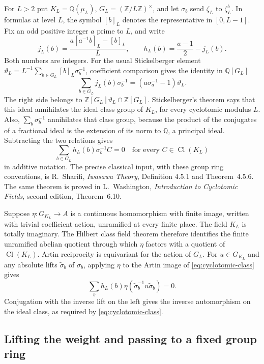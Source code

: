For \(L>2\) put \(K_L=\mathbb Q(\mu_L)\),
\(G_L=(\mathbb Z/L\mathbb Z)^\times\), and let \(\sigma_b\) send
\(\zeta_L\) to \(\zeta_L^b\). In formulas at level \(L\), the
symbol \([b]_L\) denotes the representative in \([0,L-1]\).
Fix an odd positive integer \(a\) prime to \(L\), and write
\[
 j_L(b)=\frac{a[a^{-1}b]_L-[b]_L}{L},\qquad
 h_L(b)=\frac{a-1}{2}-j_L(b).
\]
Both numbers are integers. For the usual Stickelberger element
\(\vartheta_L=L^{-1}\sum_{b\in G_L}[b]_L\sigma_b^{-1}\), coefficient
comparison gives the identity in \(\mathbb Q[G_L]\)
\[
 \sum_{b\in G_L}j_L(b)\sigma_b^{-1}
   =(a\sigma_a^{-1}-1)\vartheta_L.
\]
The right side belongs to \(\mathbb Z[G_L]\vartheta_L\cap
\mathbb Z[G_L]\). Stickelberger's theorem says that this ideal
annihilates the ideal class group of \(K_L\), for every cyclotomic
modulus \(L\). Also, \(\sum_b\sigma_b^{-1}\) annihilates that class
group, because the product of the conjugates of a fractional ideal
is the extension of its norm to \(\mathbb Q\), a principal ideal.
Subtracting the two relations gives
\begin{equation}
 \sum_{b\in G_L}h_L(b)\sigma_b^{-1}C=0
 \quad\text{for every } C\in\operatorname{Cl}(K_L)
 \label{eq:cyclotomic-class}
\end{equation}
in additive notation. The precise classical input, with these group
ring conventions, is R.~Sharifi, \emph{Iwasawa Theory}, Definition
4.5.1 and Theorem~4.5.6. The same theorem is proved in
L.~Washington, \emph{Introduction to Cyclotomic Fields}, second
edition, Theorem~6.10.

Suppose \(\eta:G_{K_L}\to A\) is a continuous homomorphism with
finite image, written with trivial coefficient action, unramified
at every finite place. The field \(K_L\) is totally imaginary.
The Hilbert class field theorem therefore identifies the finite
unramified abelian quotient through which \(\eta\) factors with a
quotient of \(\operatorname{Cl}(K_L)\). Artin reciprocity is equivariant
for the action of \(G_L\). For \(u\in G_{K_L}\) and any absolute
lifts \(\widetilde\sigma_b\) of \(\sigma_b\), applying \(\eta\) to
the Artin image of \eqref{eq:cyclotomic-class} gives
\begin{equation}
 \sum_b h_L(b)\eta(\widetilde\sigma_b^{-1}u\widetilde\sigma_b)=0.
 \label{eq:cyclotomic-hom}
\end{equation}
Conjugation with the inverse lift on the left gives the inverse
automorphism on the ideal class, as required by \eqref{eq:cyclotomic-class}.

\subsection{Lifting the weight and passing to a fixed group ring}

